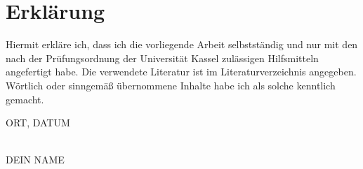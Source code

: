 \usepackage[utf8]{inputenc}
\usepackage[T1]{fontenc}

\chapter*{Erklärung}

Hiermit erkläre ich, dass ich die vorliegende Arbeit selbstständig und nur mit den nach der Prüfungsordnung der Universität Kassel zulässigen Hilfsmitteln angefertigt habe.
Die verwendete Literatur ist im Literaturverzeichnis angegeben.
Wörtlich oder sinngemäß übernommene Inhalte habe ich als solche kenntlich gemacht.\\

\vspace{1cm}

ORT, DATUM

\begin{flushright}
  \underline{\hspace{7cm}} \\
  DEIN NAME
\end{flushright}
